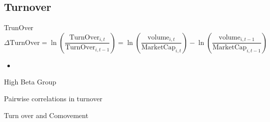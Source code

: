 \documentclass{beamer}
\begin{document}
 \subsection{Turnover}
	\begin{frame}{TrunOver}
		\begin{equation*}
			\Delta \text{TurnOver} = \ln(\frac{\text{TurnOver}_{i,t}}{\text{TurnOver}_{i,t-1}}) = 
			\ln({\frac{\text{volume}_{i,t}}{\text{MarketCap}_{i,t}}}) - \ln({\frac{\text{volume}_{i,t-1}}{\text{MarketCap}_{i,t-1}}})
		\end{equation*}
		\pause
\begin{itemize}
	\item 
	\cite{Liquidity2016}
\end{itemize}


	\pause
	\begin{table}[htbp]
		\centering
		\resizebox{0.95\textheight}{!}{
			
		}
	\end{table}
	
\end{frame}
\begin{frame}{High Beta Group}
	\begin{table}[htbp]
\centering
		\resizebox{0.95\textwidth}{!}{
			\centering
			
		}
		\label{Turnovercrosssection}
	\end{table}
\end{frame}

\begin{frame}{Pairwise correlations in  turnover}
	\begin{table}[htbp]
		\centering
		\resizebox{0.95\textwidth}{!}{
			\centering
			
		}
		\label{mresult2-turnover}
	\end{table}
\end{frame}
	\begin{frame}{Turn over and Comovement}
		\begin{table}[htbp]
			\centering
			\resizebox{\textheight}{!}{
				
			}
		\end{table}
	\end{frame}

	
	
\end{document}
